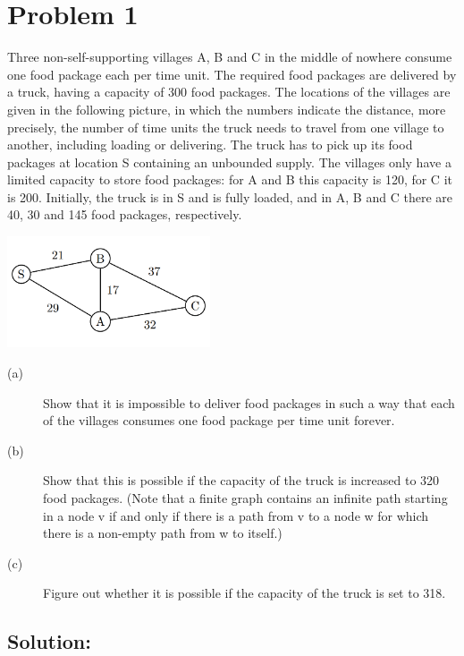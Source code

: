 \section*{Problem 1}

Three non-self-supporting villages A, B and C in the middle of nowhere consume one food package each per time unit. The required food packages are delivered by a truck, having a capacity of 300 food packages. The locations of the villages are given in the following picture, in which the numbers indicate the distance, more precisely, the number of time units the truck needs to travel from one village to another, including loading or delivering. The truck has to pick up its food packages at location S containing an unbounded supply. The villages only have a limited capacity to store food packages: for A and B this capacity is 120, for C it is 200. Initially, the truck is in S and is fully loaded, and in A, B and C there are 40, 30 and 145 food packages, respectively.

\begin{center}
\includegraphics[width=0.45\textwidth]{P1_villages.png}
\end{center}

\begin{description}
  \item[(a)] Show that it is impossible to deliver food packages in such a way that each of the villages consumes one food package per time unit forever.
  \item[(b)]  Show that this is possible if the capacity of the truck is increased to 320 food packages. (Note that a finite graph contains an infinite path starting in a node v if and only if there is a path from v to a node w for which there is a non-empty path from w to itself.)
  \item[(c)]  Figure out whether it is possible if the capacity of the truck is set to 318.
\end{description}

\subsection*{Solution:}

